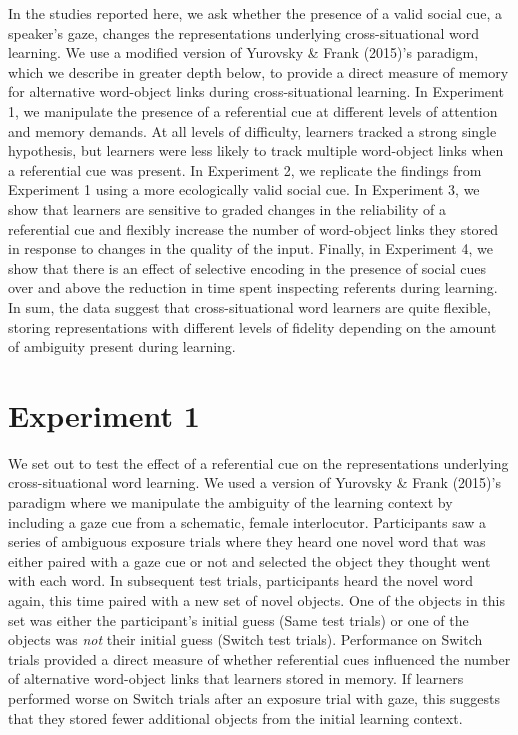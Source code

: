 \documentclass[authoryear, review]{elsarticle}
\begin{document}
In the studies reported here, we ask whether the presence of a valid
social cue, a speaker's gaze, changes the representations underlying
cross-situational word learning. We use a modified version of Yurovsky
\& Frank (2015)'s paradigm, which we describe in greater depth below, to
provide a direct measure of memory for alternative word-object links
during cross-situational learning. In Experiment 1, we manipulate the
presence of a referential cue at different levels of attention and
memory demands. At all levels of difficulty, learners tracked a strong
single hypothesis, but learners were less likely to track multiple
word-object links when a referential cue was present. In Experiment 2,
we replicate the findings from Experiment 1 using a more ecologically
valid social cue. In Experiment 3, we show that learners are sensitive
to graded changes in the reliability of a referential cue and flexibly
increase the number of word-object links they stored in response to
changes in the quality of the input. Finally, in Experiment 4, we show
that there is an effect of selective encoding in the presence of social
cues over and above the reduction in time spent inspecting referents
during learning. In sum, the data suggest that cross-situational word
learners are quite flexible, storing representations with different
levels of fidelity depending on the amount of ambiguity present during
learning.

\section{Experiment 1}\label{experiment-1}

We set out to test the effect of a referential cue on the
representations underlying cross-situational word learning. We used a
version of Yurovsky \& Frank (2015)'s paradigm where we manipulate the
ambiguity of the learning context by including a gaze cue from a
schematic, female interlocutor. Participants saw a series of ambiguous
exposure trials where they heard one novel word that was either paired
with a gaze cue or not and selected the object they thought went with
each word. In subsequent test trials, participants heard the novel word
again, this time paired with a new set of novel objects. One of the
objects in this set was either the participant's initial guess (Same
test trials) or one of the objects was \emph{not} their initial guess
(Switch test trials). Performance on Switch trials provided a direct
measure of whether referential cues influenced the number of alternative
word-object links that learners stored in memory. If learners performed
worse on Switch trials after an exposure trial with gaze, this suggests
that they stored fewer additional objects from the initial learning
context.
\end{document}
